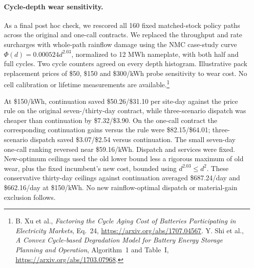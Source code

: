\paragraph{Cycle-depth wear sensitivity.}
As a final post hoc check, we rescored all 160 fixed matched-stock policy paths across the original and one-call contracts. We replaced the throughput and rate surcharges with whole-path rainflow damage using the NMC case-study curve $\Phi(d)=0.000524d^{2.03}$, normalized to 12 MWh nameplate, with both half and full cycles. Two cycle counters agreed on every depth histogram. Illustrative pack replacement prices of \$50, \$150 and \$300/kWh probe sensitivity to wear cost. No cell calibration or lifetime measurements are available.\footnote{B. Xu et al., \emph{Factoring the Cycle Aging Cost of Batteries Participating in Electricity Markets}, Eq.~24, \url{https://arxiv.org/abs/1707.04567}. Y. Shi et al., \emph{A Convex Cycle-based Degradation Model for Battery Energy Storage Planning and Operation}, Algorithm~1 and Table~I, \url{https://arxiv.org/abs/1703.07968}.}

At \$150/kWh, continuation saved \$50.26/\$31.10 per site-day against the price rule on the original seven-/thirty-day contract, while three-scenario dispatch was cheaper than continuation by \$7.32/\$3.90. On the one-call contract the corresponding continuation gains versus the rule were \$82.15/\$64.01; three-scenario dispatch saved \$3.07/\$2.54 versus continuation. The small seven-day one-call ranking reversed near \$59.16/kWh. Dispatch and services were fixed. New-optimum ceilings used the old lower bound less a rigorous maximum of old wear, plus the fixed incumbent's new cost, bounded using $d^{2.03}\le d^2$. These conservative thirty-day ceilings against continuation averaged \$687.24/day and \$662.16/day at \$150/kWh. No new rainflow-optimal dispatch or material-gain exclusion follows.
